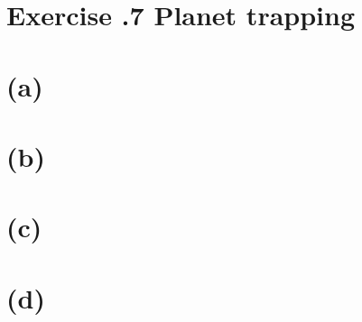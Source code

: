 \documentclass[a4paper,12pt]{article}
\begin{document}
\section*{\textbf{Exercise \uppercase\expandafter{}.7 Planet trapping}}
\section*{(a)}
\section*{(b)}
\section*{(c)}
\section*{(d)}
\end{document}
